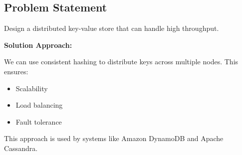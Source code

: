 \subsection{Problem Statement}\label{problem-statement}

Design a distributed key-value store that can handle high throughput.

\textbf{Solution Approach:}

We can use consistent hashing to distribute keys across multiple nodes. This ensures:

\begin{itemize}
\tightlist
\item
Scalability
\item
Load balancing
\item
Fault tolerance
\end{itemize}

This approach is used by systems like Amazon DynamoDB and Apache Cassandra.